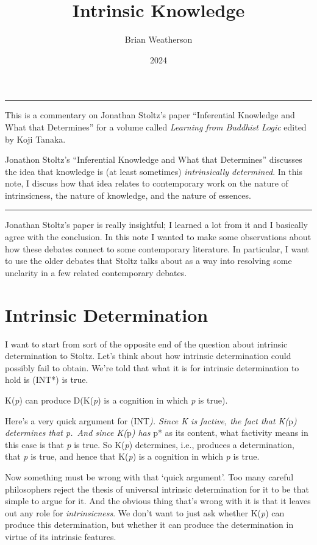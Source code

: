 \documentclass[
  10pt,
  letterpaper,
  DIV=11,
  numbers=noendperiod,
  twoside]{scrartcl}
\title{Intrinsic Knowledge}
\author{Brian Weatherson}
\date{2024}
\providecommand{\tightlist}{%
  \setlength{\itemsep}{0pt}\setlength{\parskip}{0pt}}\usepackage{longtable,booktabs,array}
\renewenvironment{abstract}
 {\vspace{-1.25cm}
 \quotation\small\noindent\rule{\linewidth}{.5pt}\par\smallskip
 \noindent }
 {\par\noindent\rule{\linewidth}{.5pt}\endquotation}
\begin{document}
\maketitle
\begin{abstract}
This is a commentary on Jonathan Stoltz's paper ``Inferential Knowledge
and What that Determines'' for a volume called \emph{Learning from
Buddhist Logic} edited by Koji Tanaka.

Jonathon Stoltz's ``Inferential Knowledge and What that Determines''
discusses the idea that knowledge is (at least sometimes)
\emph{intrinsically determined}. In this note, I discuss how that idea
relates to contemporary work on the nature of intrinsicness, the nature
of knowledge, and the nature of essences.
\end{abstract}

Jonathan Stoltz's paper is really insightful; I learned a lot from it
and I basically agree with the conclusion. In this note I wanted to make
some observations about how these debates connect to some contemporary
literature. In particular, I want to use the older debates that Stoltz
talks about as a way into resolving some unclarity in a few related
contemporary debates.

\section{Intrinsic Determination}\label{sec-intrinsic-determination}

I want to start from sort of the opposite end of the question about
intrinsic determination to Stoltz. Let's think about how intrinsic
determination could possibly fail to obtain. We're told that what it is
for intrinsic determination to hold is (INT*) is true.

\begin{description}
\tightlist
\item[(INT*)]
K(\emph{p}) can produce D(K(\emph{p}) is a cognition in which \emph{p}
is true).
\end{description}

Here's a very quick argument for (INT\emph{). Since K is factive, the
fact that K(}p\emph{) determines that p.~And since K(}p\emph{) has }p*
as its content, what factivity means in this case is that \emph{p} is
true. So K(\emph{p}) determines, i.e., produces a determination, that
\emph{p} is true, and hence that K(\emph{p}) is a cognition in which
\emph{p} is true.

Now something must be wrong with that `quick argument'. Too many careful
philosophers reject the thesis of universal intrinsic determination for
it to be that simple to argue for it. And the obvious thing that's wrong
with it is that it leaves out any role for \emph{intrinsicness}. We
don't want to just ask whether K(\emph{p}) can produce this
determination, but whether it can produce the determination in virtue of
its intrinsic features.
\end{document}
